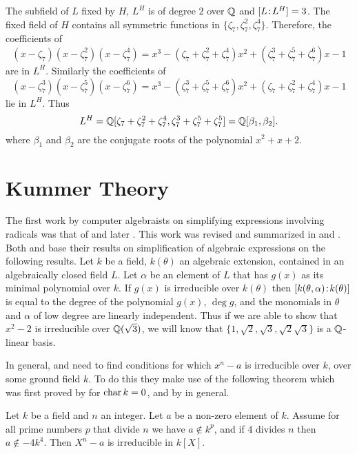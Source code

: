 The subfield of $L$ fixed by $H$, $L^H$ is of degree $2$ over $\mathbb{Q}$ and
$[L\!:\!L^H]=3$.  The fixed field of $H$ contains all symmetric
functions in $\{ \zeta_7, \zeta_7^2, \zeta_7^4 \}$.  Therefore, the
coefficients of
\[
(x - \zeta_7)(x - \zeta_7^2)(x - \zeta_7^4) = x^3- (\zeta_7 + \zeta_7^2 +
\zeta_7^4)x^2 + (\zeta_7^3 + \zeta_7^5 + \zeta_7^6)x - 1
\]
are in $L^H$.  Similarly the coefficients of
\[
(x - \zeta_7^3)(x - \zeta_7^5)(x - \zeta_7^6) = x^3- (\zeta_7^3 + \zeta_7^5
+ \zeta_7^6)x^2 + (\zeta_7 + \zeta_7^2 + \zeta_7^4)x - 1
\]
lie in $L^H$.  Thus
\[
L^H = \mathbb{Q}[\zeta_7 + \zeta_7^2 + \zeta_7^4, \zeta_7^3+\zeta_7^5+\zeta_7^5] =
\mathbb{Q}[\beta_1, \beta_2].
\]
where $\beta_1$ and $\beta_2$ are the conjugate roots of the polynomial
$x^2+x+2$.

\section{Kummer Theory}
\label{Kummer:Sec}

The first work by computer algebraists on simplifying expressions
involving radicals was that of {\Caviness}
\cite{Caviness:Thesis,Caviness:Canonical} and later {\Fateman}
\cite{Fateman:Thesis}.  This work was revised and summarized in
{\Caviness} and {\Fateman} \cite{Caviness:Fateman}.  Both {\Caviness}
and {\Fateman} base their results on simplification of algebraic
expressions on the following results.  Let $k$ be a field, $k(\theta)$
an algebraic extension, contained in an algebraically closed field
$L$.  Let $\alpha$ be an element of $L$ that has $g(x)$ as its minimal
polynomial over $k$.  If $g(x)$ is irreducible over $k(\theta)$ then
$[k(\theta,\alpha)\!:\!k(\theta)]$ is equal to the degree of
the polynomial $g(x)$, $\deg g$, and the monomials in $\theta$ and
$\alpha$ of low degree are linearly independent.  Thus if we are able
to show that $x^2 - 2$ is irreducible over $\mathbb{Q}(\sqrt{3})$, we will
know that $\{1, \sqrt{2}, \sqrt{3}, \sqrt{2} \sqrt{3}\}$ is a
$\mathbb{Q}$-linear basis.

In general, {\Caviness} and {\Fateman} need to find conditions for
which $x^n - a$ is irreducible over $k$, over some ground field $k$.
To do this they make use of the following theorem which was first
proved by {\Capelli} \cite{Capelli} for $\mathop{\rm char}\nolimits k = 0$, and by {\Redei}
\cite{Redei} in general.

\begin{proposition}[{\Capelli}] \label{Capelli:Prop}
Let $k$ be a field and $n$ an integer.  Let $a$ be a non-zero element
of $k$.  Assume for all prime numbers $p$ that divide $n$ we have $a
\notin k^p$, and if $4$ divides $n$ then $a \notin -4k^4$.  Then $X^n
- a$ is irreducible in $k[X]$.
\end{proposition}

